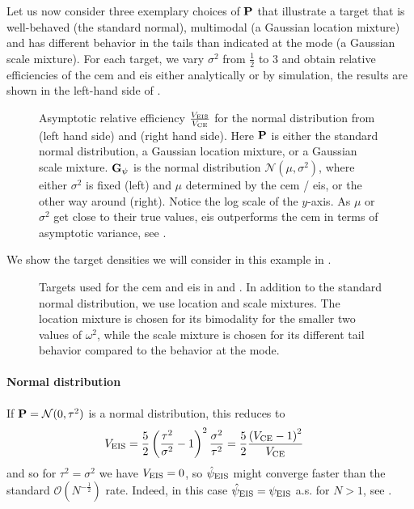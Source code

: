 \begin{example}
    Let us now consider three exemplary choices of $\P$ that illustrate a target that is well-behaved (the standard normal), multimodal (a Gaussian location mixture) and has different behavior in the tails than indicated at the mode (a Gaussian scale mixture). 
    For each target, we vary $\sigma^{2}$ from $\frac{1}{2}$ to $3$ and obtain relative efficiencies of the \gls{cem} and \gls{eis} either analytically or by simulation, the results are shown in the left-hand side of .

    \begin{figure}
        \centering

        \resizebox{\textwidth}{!}{%
        }
        \caption{Asymptotic relative efficiency $\frac{V_{\eis}}{V_{\ce}}$ for the normal distribution from  (left hand side) and  (right hand side). Here $\P$ is either the standard normal distribution, a Gaussian location mixture, or a Gaussian scale mixture. $\G_{\psi}$ is the normal distribution $\mathcal N(\mu, \sigma^{2})$, where either $\sigma^{2}$ is fixed (left) and $\mu$ determined by the \gls{cem} / \gls{eis}, or the other way around (right). Notice the log scale of the $y$-axis. As $\mu$ or $\sigma^{2}$ get close to their true values, \gls{eis} outperforms the \gls{cem} in terms of asymptotic variance, see . }
        \label{fig:are}
    \end{figure}


    We show the target densities we will consider in this example in .
    \begin{figure}
        \centering

        \resizebox{\textwidth}{!}{%
        }
        \caption{Targets used for the \acrshort{cem} and \acrshort{eis} in  and . In addition to the standard normal distribution, we use location and scale mixtures. The location mixture is chosen for its bimodality for the smaller two values of $\omega^{2}$, while the scale mixture is chosen for its different tail behavior compared to the behavior at the mode.}
        \label{fig:targets}
    \end{figure}

    
    \paragraph{Normal distribution}
    If $\P = \mathcal N(0, \tau^{2})$ is a normal distribution, this reduces to
    \begin{align*}
        V_{\eis} &= \frac{5}{2} \left( \frac{\tau^{2}}{\sigma^{2}} - 1 \right)^{2} \frac{\sigma^{2}}{\tau^{2}} = \frac{5}{2} \frac{\left( V_{\ce} - 1\right)^{2}}{V_{\ce}}
    \end{align*}
    and so for $\tau^{2} = \sigma^{2}$ we have $V_{\eis} = 0$, so $\hpeis$ might converge faster than the standard $\mathcal O( N^{-\frac{1}{2}})$ rate. Indeed, in this case $\hpeis = \peis$ a.s. for $N > 1$, see .


\end{example}
